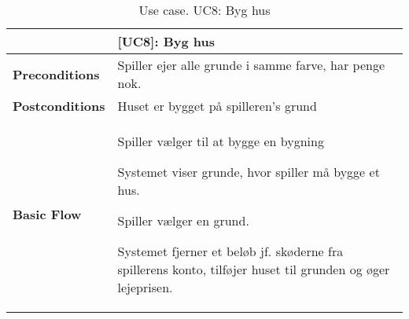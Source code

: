 \documentclass[class=article, crop=false]{standalone}
\begin{document}
    \begin{table}[H]
        \caption{Use case. UC8: Byg hus}
        \begin{tabularx}{\textwidth}{|l|X|}
            \hline
            & \textbf{[UC8]: Byg hus}   \\ \hline
            \textbf{Preconditions}       & Spiller ejer alle grunde i samme farve, har penge nok.\\ \hline
            \textbf{Postconditions}      & Huset er bygget på spilleren's grund\\ \hline


            \textbf{Basic Flow} & \begin{tabenum}
                                      \item Spiller vælger til at bygge en bygning
                                      \item Systemet viser grunde, hvor spiller må bygge et hus.
                                      \item Spiller vælger en grund.
                                      \item Systemet fjerner et beløb jf. skøderne fra spillerens konto, tilføjer huset til grunden og øger lejeprisen.
            \end{tabenum}   \\ \hline

        \end{tabularx}


    \end{table}
\end{document}
